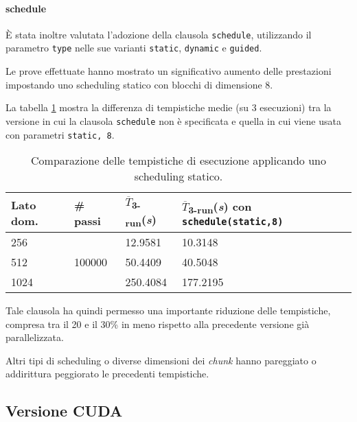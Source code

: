 \paragraph{schedule}

È stata inoltre valutata l'adozione della clausola \texttt{schedule},
utilizzando il parametro \texttt{type} nelle sue varianti \texttt{static},
\texttt{dynamic} e \texttt{guided}.

Le prove effettuate hanno mostrato un significativo aumento delle prestazioni
impostando uno scheduling statico con blocchi di dimensione 8.

La tabella \ref{tab:schedule} mostra la differenza di tempistiche medie (su 3
esecuzioni) tra la versione in cui la clausola \texttt{schedule} non è
specificata e quella in cui viene usata con parametri \texttt{static, 8}.

\begin{table}[ht]
\centering
\begin{tabularx}{400pt}{XXXX}
\toprule
Lato dom. & \# passi & $\overline{T}$\textsubscript{3-run}(\textit{s})&
$\overline{T}$\textsubscript{3-run}(\textit{s}) con \texttt{schedule(static,8)}\\
\midrule
 256 & \multirow{3}{*}{100000} & 12.9581 & 10.3148 \\
 512 && 50.4409 & 40.5048 \\
 1024 && 250.4084 & 177.2195 \\
\bottomrule
\end{tabularx}
\caption{\label{tab:schedule}Comparazione delle tempistiche di esecuzione
applicando uno scheduling statico.}
\end{table}

Tale clausola ha quindi permesso una importante riduzione delle tempistiche,
compresa tra il 20 e il 30\% in meno rispetto alla precedente versione già
parallelizzata.

Altri tipi di scheduling o diverse dimensioni dei \textit{chunk} hanno
pareggiato o addirittura peggiorato le precedenti tempistiche.


\subsection{Versione CUDA}

